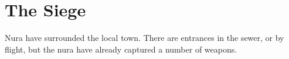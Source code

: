\chapter{The Siege}

\begin{multicols}{2}

Nura have surrounded the local town.
There are entrances in the sewer, or by flight, but the nura have already captured a number of weapons.

\end{multicols}
